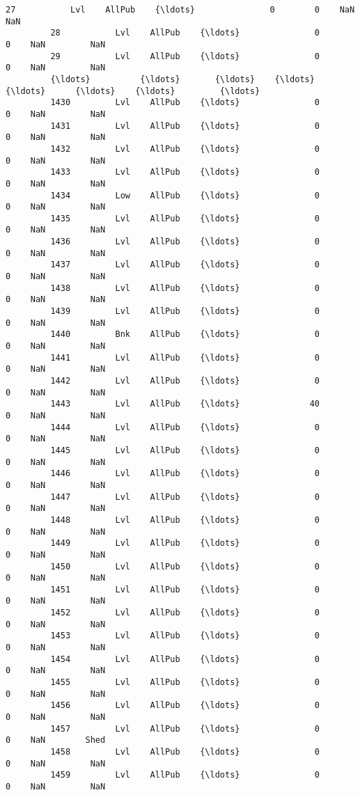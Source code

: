\documentclass[11pt]{article}
\begin{document}
\begin{Verbatim}[commandchars=\\\{\}]
         27           Lvl    AllPub    {\ldots}               0        0    NaN         NaN   
         28           Lvl    AllPub    {\ldots}               0        0    NaN         NaN   
         29           Lvl    AllPub    {\ldots}               0        0    NaN         NaN   
         {\ldots}          {\ldots}       {\ldots}    {\ldots}             {\ldots}      {\ldots}    {\ldots}         {\ldots}   
         1430         Lvl    AllPub    {\ldots}               0        0    NaN         NaN   
         1431         Lvl    AllPub    {\ldots}               0        0    NaN         NaN   
         1432         Lvl    AllPub    {\ldots}               0        0    NaN         NaN   
         1433         Lvl    AllPub    {\ldots}               0        0    NaN         NaN   
         1434         Low    AllPub    {\ldots}               0        0    NaN         NaN   
         1435         Lvl    AllPub    {\ldots}               0        0    NaN         NaN   
         1436         Lvl    AllPub    {\ldots}               0        0    NaN         NaN   
         1437         Lvl    AllPub    {\ldots}               0        0    NaN         NaN   
         1438         Lvl    AllPub    {\ldots}               0        0    NaN         NaN   
         1439         Lvl    AllPub    {\ldots}               0        0    NaN         NaN   
         1440         Bnk    AllPub    {\ldots}               0        0    NaN         NaN   
         1441         Lvl    AllPub    {\ldots}               0        0    NaN         NaN   
         1442         Lvl    AllPub    {\ldots}               0        0    NaN         NaN   
         1443         Lvl    AllPub    {\ldots}              40        0    NaN         NaN   
         1444         Lvl    AllPub    {\ldots}               0        0    NaN         NaN   
         1445         Lvl    AllPub    {\ldots}               0        0    NaN         NaN   
         1446         Lvl    AllPub    {\ldots}               0        0    NaN         NaN   
         1447         Lvl    AllPub    {\ldots}               0        0    NaN         NaN   
         1448         Lvl    AllPub    {\ldots}               0        0    NaN         NaN   
         1449         Lvl    AllPub    {\ldots}               0        0    NaN         NaN   
         1450         Lvl    AllPub    {\ldots}               0        0    NaN         NaN   
         1451         Lvl    AllPub    {\ldots}               0        0    NaN         NaN   
         1452         Lvl    AllPub    {\ldots}               0        0    NaN         NaN   
         1453         Lvl    AllPub    {\ldots}               0        0    NaN         NaN   
         1454         Lvl    AllPub    {\ldots}               0        0    NaN         NaN   
         1455         Lvl    AllPub    {\ldots}               0        0    NaN         NaN   
         1456         Lvl    AllPub    {\ldots}               0        0    NaN         NaN   
         1457         Lvl    AllPub    {\ldots}               0        0    NaN        Shed   
         1458         Lvl    AllPub    {\ldots}               0        0    NaN         NaN   
         1459         Lvl    AllPub    {\ldots}               0        0    NaN         NaN   
         

\end{Verbatim}
\end{document}
